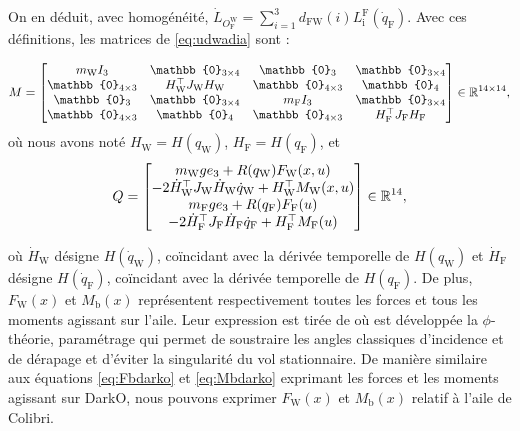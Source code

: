 On en déduit, avec homogénéité, $\dot{L}_{O_{\text{F}}^{\text{W}}} = \sum_{i=1}^{3} d_{\text{FW}}(i) L_{\text{i}}^{\text{F}} (\dot{q}_{\text{F}})$. Avec ces définitions, les matrices de \eqref{eq:udwadia} sont :


\begin{align}
    M = \begin{bmatrix}
        m_{\text{W}} I_{3} & \mathbb{0}_{3 \times 4} & \mathbb{0}_{3} & \mathbb{0}_{3 \times 4}\\
        \mathbb{0}_{4 \times 3} & H_{\text{W}}^\top J_{\text{W}} H_{\text{W}} & \mathbb{0}_{4 \times 3} & \mathbb{0}_{4}\\
        \mathbb{0}_{3} & \mathbb{0}_{3 \times 4} & m_{\text{F}} I_{3} & \mathbb{0}_{3 \times 4} \\
        \mathbb{0}_{4 \times 3} & \mathbb{0}_{4 } & \mathbb{0}_{4 \times 3} & H_{\text{F}}^\top J_{\text{F}} H_{\text{F}}    \end{bmatrix}\in \real^{14\times14},
\end{align}
où nous avons noté $H_{\text{W}} = H(q_{\text{W}})$, $H_{\text{F}} = H(q_{\text{F}})$, et
\begin{align}
    \label{eq:Q}
    Q = \begin{bmatrix}
            m_{\text{W}} g e_3 + R(q_{\text{W}}) F_{\text{W}}(x, u)\\
            -2\dot{H}_{\text{W}}^\top J_{\text{W}} \dot{H}_{\text{W}} \dot{q}_{\text{W}} + H_{\text{W}}^\top M_{\text{W}}(x, u)\\
            m_{\text{F}} g e_3 + R(q_{\text{F}}) F_{\text{F}}(u)\\
            -2\dot{H}_{\text{F}}^\top J_{\text{F}} \dot{H}_{\text{F}} \dot{q}_{\text{F}} + H_{\text{F}}^\top M_{\text{F}}(u)\\
        \end{bmatrix} \in {\mathbb R}^{14},
\end{align}


où $\dot{H}_{\text{W}}$ désigne $H(\dot{q}_{\text{W}})$, coïncidant avec la dérivée temporelle de $H(q_{\text{W}})$ et $\dot{H}_{\text{F}}$ désigne $H(\dot{q}_{\text{F}})$, coïncidant avec la dérivée temporelle de $H(q_{\text{F}})$. De plus, $F_{\text{W}}(x)$ et $M_{\text{b}}(x)$ représentent respectivement toutes les forces et tous les moments agissant sur l'aile. Leur expression est tirée de \cite[équations (45) et (57)]{lustosaHal-03035938} où est développée la $\phi$-théorie, paramétrage qui permet de soustraire les angles classiques d'incidence et de dérapage et d'éviter la singularité du vol stationnaire. De manière similaire aux équations \eqref{eq:Fbdarko} et \eqref{eq:Mbdarko} exprimant les forces et les moments agissant sur DarkO, nous pouvons exprimer $F_{\text{W}}(x)$ et $M_{\text{b}}(x)$ relatif à l'aile de Colibri.

